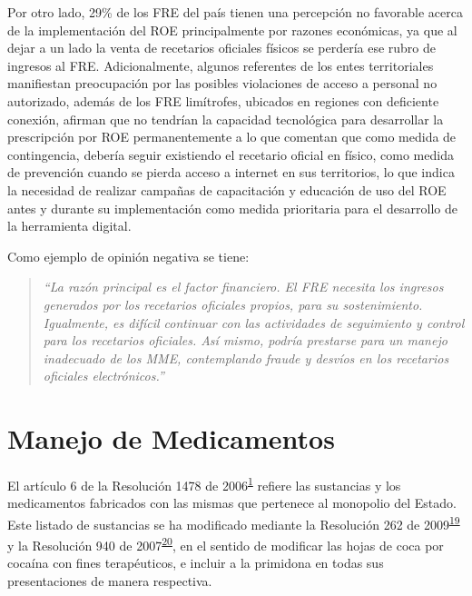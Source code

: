 \documentclass[
  oneside]{book}
\begin{document}
Por otro lado, 29\% de los FRE del país tienen una percepción no favorable acerca de la implementación del ROE principalmente por razones económicas, ya que al dejar a un lado la venta de recetarios oficiales físicos se perdería ese rubro de ingresos al FRE. Adicionalmente, algunos referentes de los entes territoriales manifiestan preocupación por las posibles violaciones de acceso a personal no autorizado, además de los FRE limítrofes, ubicados en regiones con deficiente conexión, afirman que no tendrían la capacidad tecnológica para desarrollar la prescripción por ROE permanentemente a lo que comentan que como medida de contingencia, debería seguir existiendo el recetario oficial en físico, como medida de prevención cuando se pierda acceso a internet en sus territorios, lo que indica la necesidad de realizar campañas de capacitación y educación de uso del ROE antes y durante su implementación como medida prioritaria para el desarrollo de la herramienta digital.

Como ejemplo de opinión negativa se tiene:

\begin{quote}
\emph{``La razón principal es el factor financiero. El FRE necesita los ingresos generados por los recetarios oficiales propios, para su sostenimiento. Igualmente, es difícil continuar con las actividades de seguimiento y control para los recetarios oficiales. Así mismo, podría prestarse para un manejo inadecuado de los MME, contemplando fraude y desvíos en los recetarios oficiales electrónicos.''}
\end{quote}

\hypertarget{manejo-de-medicamentos}{%
\chapter{Manejo de Medicamentos}\label{manejo-de-medicamentos}}


El artículo 6 de la Resolución 1478 de 2006\textsuperscript{\protect\hyperlink{ref-MSPS1478-2006}{1}} refiere las sustancias y los medicamentos fabricados con las mismas que pertenece al monopolio del Estado. Este listado de sustancias se ha modificado mediante la Resolución 262 de 2009\textsuperscript{\protect\hyperlink{ref-MSPS262-2009}{19}} y la Resolución 940 de 2007\textsuperscript{\protect\hyperlink{ref-MSPS940-2007}{20}}, en el sentido de modificar las hojas de coca por cocaína con fines terapéuticos, e incluir a la primidona en todas sus presentaciones de manera respectiva.
\end{document}
